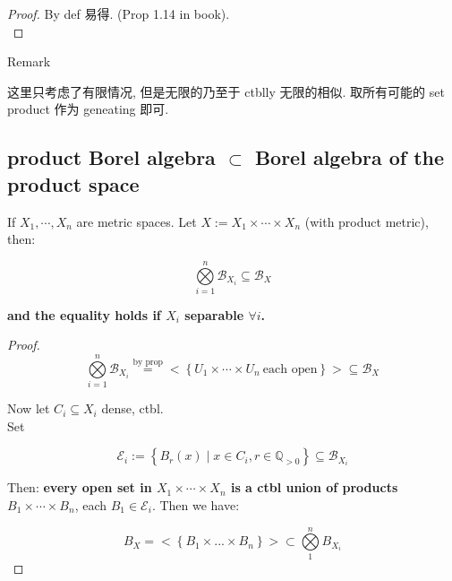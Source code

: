 \documentclass{qlnotes-export}
\begin{document}
\begin{proof}

By def 易得. (Prop 1.14 in book).\\

\end{proof}

\begin{qlremark}{Remark}

这里只考虑了有限情况, 但是无限的乃至于 ctblly 无限的相似. 取所有可能的 set product 作为 geneating 即可.

\end{qlremark}

\subsection{\texorpdfstring{product Borel algebra \(\subset\) Borel algebra of the product space}{product Borel algebra \textbackslash subset Borel algebra of the product space}}\label{product-borel-algebra-subset-borel-algebra-of-the-product-space}

\begin{proposition}

If \(X_{1},\cdots,X_{n}\) are metric spaces. Let \(X := X_{1} \times \cdots \times X_{n}\) (with product metric), then:

\[\bigotimes\limits_{i = 1}^{n}\mathcal{B}_{X_{i}} \subseteq \mathcal{B}_{X}\]

\textbf{and the equality holds if \(X_{i}\) separable \(\forall i\).}

\end{proposition}

\begin{proof}

\[\bigotimes\limits_{i = 1}^{n}\mathcal{B}_{X_{i}}\overset{\text{by prop}}{=} < \left\{ {U_{1} \times \cdots \times U_{n}\ \text{each open}} \right\} > \subseteq \mathcal{B}_{X}\]

Now let \(C_{i} \subseteq X_{i}\) dense, ctbl.\\
Set

\[\mathcal{E}_{i} := \left\{ {B_{r}(x) \mid x \in C_{i}, r \in {\mathbb{Q}}_{> 0}} \right\} \subseteq \mathcal{B}_{X_{i}}\]

Then: \textbf{every open set in \(X_{1} \times \cdots \times X_{n}\) is a ctbl union of products \(B_{1} \times \cdots \times B_{n}\)}, each \(B_{1} \in \mathcal{E}_{i}\). Then we have:

\[B_{X} = < \left\{ {B_{1} \times ... \times B_{n}} \right\} > \subset \bigotimes\limits_{1}^{n}B_{X_{i}}\]

\end{proof}
\end{document}
